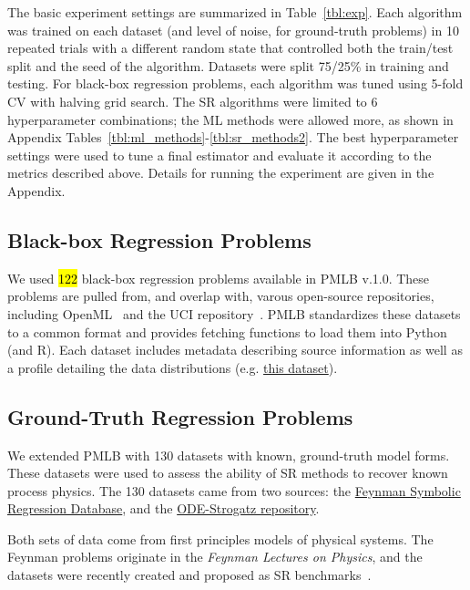 The basic experiment settings are summarized in Table~\ref{tbl:exp}.
Each algorithm was trained on each dataset (and level of noise, for ground-truth problems) in 10 repeated trials with a different random state that controlled both the train/test split and the seed of the algorithm.  
Datasets were split 75/25\% in training and testing. 
For black-box regression problems, each algorithm was tuned using 5-fold CV with halving grid search. 
The SR algorithms were limited to 6 hyperparameter combinations; the ML methods were allowed more, as shown in Appendix Tables~\ref{tbl:ml_methods}-\ref{tbl:sr_methods2}. 
The best hyperparameter settings were used to tune a final estimator and evaluate it according to the metrics described above. 
Details for running the experiment are given in the Appendix. 



\subsection{Black-box Regression Problems}

We used \hl{122} black-box regression problems available in PMLB v.1.0. 
These problems are pulled from, and overlap with, varous open-source repositories, including OpenML~\cite{vanschorenOpenMLNetworkedScience2013} and the UCI repository~\cite{lichmanUCIMachineLearning2013a}. 
PMLB standardizes these datasets to a common format and provides fetching functions to load them into Python (and R). 
Each dataset includes metadata describing source information as well as a profile detailing the data distributions (e.g. \href{https://epistasislab.github.io/pmlb/profile/analcatdata_aids.html}{this dataset}).

\subsection{Ground-Truth Regression Problems}
We extended PMLB with 130 datasets with known, ground-truth model forms. 
These datasets were used to assess the ability of SR methods to recover known process physics. 
The 130 datasets came from two sources: the \href{https://space.mit.edu/home/tegmark/aifeynman.html}{Feynman Symbolic Regression Database}, 
and the \href{https://github.com/lacava/ode-strogatz}{ODE-Strogatz repository}.

Both sets of data come from first principles models of physical systems. 
The Feynman problems originate in the \textit{Feynman Lectures on Physics}\cite{feynmanFeynmanLecturesPhysics2015}, and the datasets were recently created and proposed as SR benchmarks~\citet{udrescuAIFeynmanPhysicsInspired2020}. 

